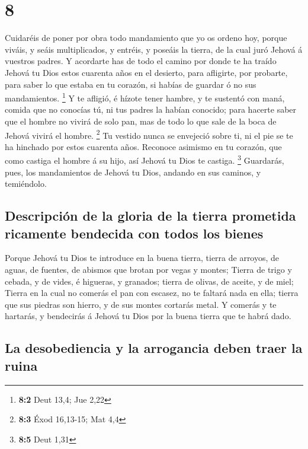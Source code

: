 \hypertarget{section-7}{%
\section{8}\label{section-7}}

 Cuidaréis de poner por obra todo mandamiento que yo os
ordeno hoy, porque viváis, y seáis multiplicados, y entréis, y poseáis
la tierra, de la cual juró Jehová á vuestros padres.  Y
acordarte has de todo el camino por donde te ha traído Jehová tu Dios
estos cuarenta años en el desierto, para afligirte, por probarte, para
saber lo que estaba en tu corazón, si habías de guardar ó no sus
mandamientos. \footnote{\textbf{8:2} Deut 13,4; Jue 2,22}  Y
te afligió, é hízote tener hambre, y te sustentó con maná, comida que no
conocías tú, ni tus padres la habían conocido; para hacerte saber que el
hombre no vivirá de solo pan, mas de todo lo que sale de la boca de
Jehová vivirá el hombre. \footnote{\textbf{8:3} Éxod 16,13-15; Mat 4,4}
 Tu vestido nunca se envejeció sobre ti, ni el pie se te ha
hinchado por estos cuarenta años.  Reconoce asimismo en tu
corazón, que como castiga el hombre á su hijo, así Jehová tu Dios te
castiga. \footnote{\textbf{8:5} Deut 1,31}  Guardarás, pues,
los mandamientos de Jehová tu Dios, andando en sus caminos, y
temiéndolo.

\hypertarget{descripciuxf3n-de-la-gloria-de-la-tierra-prometida-ricamente-bendecida-con-todos-los-bienes}{%
\subsection{Descripción de la gloria de la tierra prometida ricamente
bendecida con todos los
bienes}\label{descripciuxf3n-de-la-gloria-de-la-tierra-prometida-ricamente-bendecida-con-todos-los-bienes}}

 Porque Jehová tu Dios te introduce en la buena tierra,
tierra de arroyos, de aguas, de fuentes, de abismos que brotan por vegas
y montes;  Tierra de trigo y cebada, y de vides, é higueras,
y granados; tierra de olivas, de aceite, y de miel;  Tierra
en la cual no comerás el pan con escasez, no te faltará nada en ella;
tierra que sus piedras son hierro, y de sus montes cortarás metal.
 Y comerás y te hartarás, y bendecirás á Jehová tu Dios por
la buena tierra que te habrá dado.

\hypertarget{la-desobediencia-y-la-arrogancia-deben-traer-la-ruina}{%
\subsection{La desobediencia y la arrogancia deben traer la
ruina}\label{la-desobediencia-y-la-arrogancia-deben-traer-la-ruina}}

